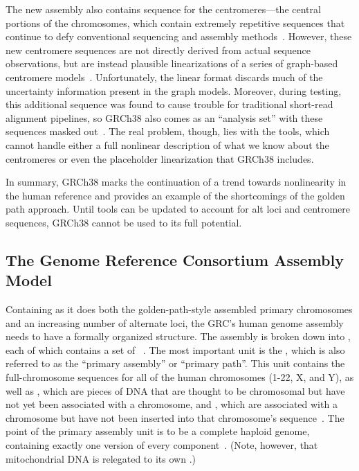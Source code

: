 The new assembly also contains sequence for the centromeres---the central portions of the chromosomes, which contain extremely repetitive sequences that continue to defy conventional sequencing and assembly methods~\cite{karolchik2014new}. However, these new centromere sequences are not directly derived from actual sequence observations, but are instead plausible linearizations of a series of graph-based centromere models~\cite{miga2014centromere}. Unfortunately, the linear format discards much of the uncertainty information present in the graph models. Moreover, during testing, this additional sequence was found to cause trouble for traditional short-read alignment pipelines, so GRCh38 also comes as an ``analysis set'' with these sequences masked out~\cite{karolchik2014new}. The real problem, though, lies with the tools, which cannot handle either a full nonlinear description of what we know about the centromeres or even the placeholder linearization that GRCh38 includes.

In summary, GRCh38 marks the continuation of a trend towards nonlinearity in the human reference and provides an example of the shortcomings of the golden path approach. Until tools can be updated to account for alt loci and centromere sequences, GRCh38 cannot be used to its full potential.

\subsection{The Genome Reference Consortium Assembly Model}

    
Containing as it does both the golden-path-style assembled primary chromosomes and an increasing number of alternate loci, the GRC's human genome assembly needs to have a formally organized structure. The assembly is broken down into , each of which contains a set of ~\cite{schneider2013genome}. The most important unit is the , which is also referred to as the ``primary assembly'' or ``primary path''. This unit contains the full-chromosome sequences for all of the human chromosomes (1-22, X, and Y), as well as , which are pieces of DNA that are thought to be chromosomal but have not yet been associated with a chromosome, and , which are associated with a chromosome but have not been inserted into that chromosome's sequence~\cite{schneider2013genome}. The point of the primary assembly unit is to be a complete haploid genome, containing exactly one version of every component~\cite{schneider2013genome}. (Note, however, that mitochondrial DNA is relegated to its own .)

